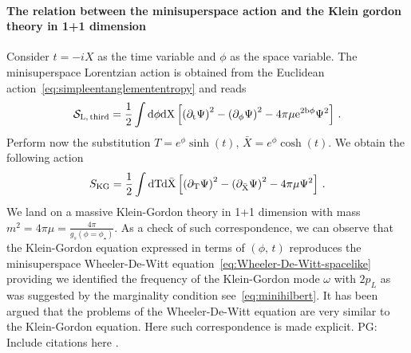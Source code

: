 \documentclass[a4paper]{article}
\newcommand{\purple}[1]{{\color{purple} #1 \color{black}}}
\newcommand{\PG}[1]{{\purple{PG: #1}}} %
\begin{document}
\paragraph{The relation between the minisuperspace action and the Klein gordon theory in 1+1 dimension}\label{par:relationminiKG}
Consider $t=-iX$ as the time variable and $\phi$ as the space variable. The minisuperspace Lorentzian action is obtained from the Euclidean action~\eqref{eq:simpleentanglemententropy} and reads
\begin{equation}
  \mathcal{S}_{\rm{L,\,third}} = \frac{1}{2} \int \rm{d}\phi \rm{d}X \left[\left(\partial_t \Psi\right)^2-\left(\partial_\phi \Psi\right)^2 -4\pi \mu e^{2b\phi}\Psi^2\right]\,.
\end{equation}
Perform now the substitution $T = e^{\phi}\sinh(t),\,\bar{X} = e^{\phi}\cosh(t)$. We obtain the following action
\begin{equation}
\begin{aligned}
    S_{\rm{KG}} = \frac{1}{2}\int \rm{d}T \rm{d}\bar{X} \left[\left(\partial_T \Psi\right)^2 -\left(\partial_{\bar{X}} \Psi\right)^2 - 4\pi \mu \Psi^2\right]\,.
\end{aligned}
\end{equation}
We land on a massive Klein-Gordon theory in 1+1 dimension with mass $m^2 = 4\pi \mu = \frac{4\pi}{g_{s}(\phi = \phi_\star)}$. As a check of such correspondence, we can observe that the Klein-Gordon equation expressed in terms of $(\phi,\,t)$ reproduces the minisuperspace Wheeler-De-Witt equation~\eqref{eq:Wheeler-De-Witt-spacelike} providing we identified the frequency of the Klein-Gordon mode $\omega$ with $2p_L$ as was suggested by the marginality condition see~\eqref{eq:minihilbert}. It has been argued that the problems of the Wheeler-De-Witt equation are very similar to the Klein-Gordon equation. Here such correspondence is made explicit.\PG{Include citations here}.
\end{document}
